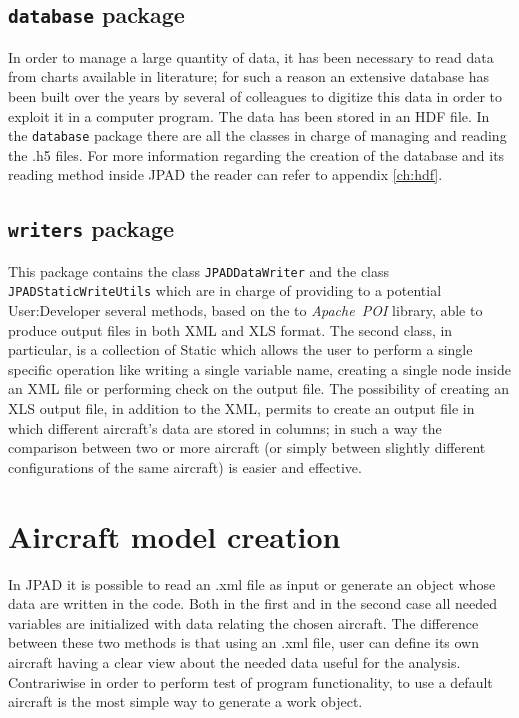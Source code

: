 \subsection{\texttt{database} package}
In order to manage a large quantity of data, it has been necessary to read data from charts available in literature; for such a reason an extensive database has been built over the years by several of colleagues to digitize this data in order to exploit it in a computer program. The data has been stored in an \gls{HDF} file. In the \lstinline[language=Java]!database! package there are all the classes in charge of managing and reading the .h5 files. For more information regarding the creation of the database and its reading method inside \gls{JPAD} the reader can refer to appendix \ref{ch:hdf}. 
%
\subsection{\texttt{writers} package}
This package contains the class \lstinline[language=Java]!JPADDataWriter! and the class \lstinline[language=Java]!JPADStaticWriteUtils! which are in charge of providing to a potential \gls{User:Developer} several methods, based on the to \emph{Apache~POI} library, able to produce output files in both XML and XLS format. The second class, in particular, is a collection of \gls{Static} which allows the user to perform a single specific operation like writing a single variable name, creating a single node inside an XML file or performing check on the output file. The possibility of creating an XLS output file, in addition to the XML, permits to create an output file in which different aircraft's data are stored in columns; in such a way the comparison between two or more aircraft (or simply between slightly different configurations of the same aircraft) is easier and effective.
%
\section{Aircraft model creation} \label{par:DefaultAircraft}
In \gls{JPAD} it is possible to read an .xml file as input or generate an object whose data are written in the code. Both in the first and in the second case all needed variables are initialized with data relating the chosen aircraft. The difference between these two methods is that using an .xml file, user can define its own aircraft having a clear view about the needed data useful for the analysis. Contrariwise in order to perform test of program functionality, to use a default aircraft is the most simple way to generate a work object.

